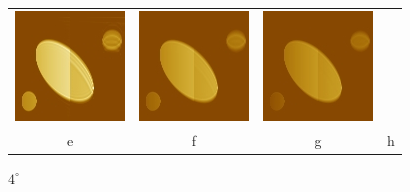 \documentclass{procDDs}
\begin{document}
\begin{figure}[h!]
\begin{tabular}{cccc}
		\includegraphics[width=0.2\linewidth]{img/7/7.jpg}&
		\includegraphics[width=0.2\linewidth]{img/7/8.jpg}&
		\includegraphics[width=0.2\linewidth]{img/7/9.jpg}\\
		e & f & g & h
	\end{tabular}
	\caption{$4^\circ$}
	\label{ris:desc3}
\end{figure}
\end{document}
